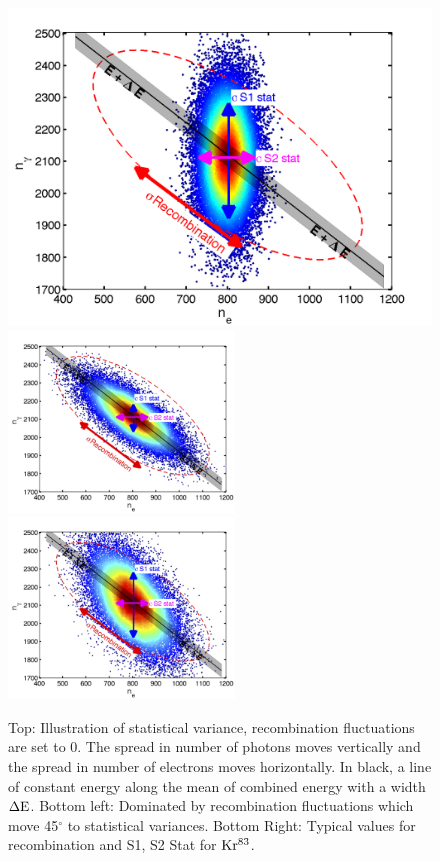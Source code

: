  \begin{figure}[h!]\centering
\includegraphics[width=130mm]{Recombination_LY_QY/Figures/EX_Stat_Fano.png}
\includegraphics[width=60mm]{Recombination_LY_QY/Figures/EX_R_Fano.png}
\includegraphics[width=60mm]{Recombination_LY_QY/Figures/EX_Kr_Fano.png}
\caption{Top: Illustration of statistical variance, recombination fluctuations are set to 0. The spread in number of photons moves vertically and the spread in number of electrons moves horizontally. In black, a line of constant energy along the mean of combined energy with a width $\rm \Delta E$. Bottom left: Dominated by recombination fluctuations which move 45$^{\circ}$ to statistical variances. Bottom Right: Typical values for recombination and  S1, S2 Stat for $\rm Kr^{83}$. }
\label{fig:Recomb}
\end{figure}


